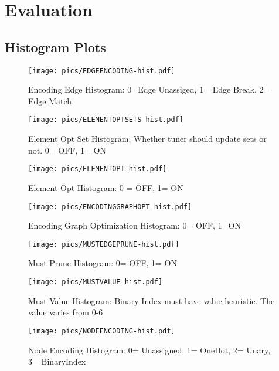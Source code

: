 \section{Evaluation}\label{sec:eval}

\subsection{Histogram Plots}\label{subsec:hist}

\begin{figure}[htb]
	\centering
	\texttt{[image: pics/EDGEENCODING-hist.pdf]}
	\caption{Encoding Edge Histogram: 0=Edge Unassiged, 1= Edge Break, 2= Edge Match}
	\label{fig:edgeencoding}
\end{figure}


\begin{figure}[htb]
	\centering
	\texttt{[image: pics/ELEMENTOPTSETS-hist.pdf]}
	\caption{Element Opt Set Histogram: Whether tuner should update sets or not. 0= OFF, 1= ON}
	\label{fig:elementoptset}
\end{figure}

\begin{figure}[htb]
	\centering
	\texttt{[image: pics/ELEMENTOPT-hist.pdf]}
	\caption{Element Opt Histogram: 0 = OFF, 1= ON}
	\label{fig:elementopt}
\end{figure}

\begin{figure}[htb]
	\centering
	\texttt{[image: pics/ENCODINGGRAPHOPT-hist.pdf]}
	\caption{Encoding Graph Optimization Histogram: 0= OFF, 1=ON}
	\label{fig:encodinggraph}
\end{figure}

\begin{figure}[htb]
	\centering
	\texttt{[image: pics/MUSTEDGEPRUNE-hist.pdf]}
	\caption{Must Prune Histogram: 0= OFF, 1= ON}
	\label{fig:mustedgeprune}
\end{figure}

\begin{figure}[htb]
	\centering
	\texttt{[image: pics/MUSTVALUE-hist.pdf]}
	\caption{Must Value Histogram: Binary Index must have value heuristic. The value varies from 0-6}
	\label{fig:mustvalue}
\end{figure}

\begin{figure}[htb]
	\centering
	\texttt{[image: pics/NODEENCODING-hist.pdf]}
	\caption{Node Encoding Histogram: 0= Unassigned, 1= OneHot, 2= Unary, 3= BinaryIndex}
	\label{fig:nodeencoding}
\end{figure}

